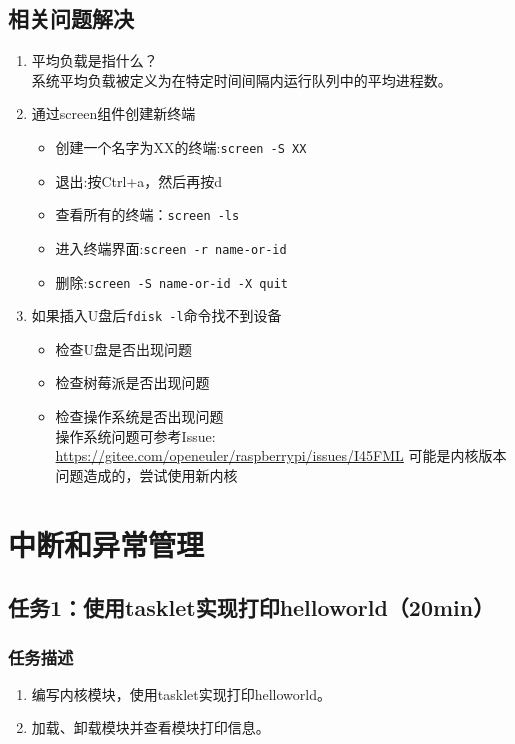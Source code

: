 \documentclass{article}
\begin{document}
\newpage

\subsection{相关问题解决}

\begin{enumerate}

	\item 平均负载是指什么？\\
	      系统平均负载被定义为在特定时间间隔内运行队列中的平均进程数。
	\item 通过screen组件创建新终端
	      \begin{itemize}
		      \item 创建一个名字为XX的终端:\verb|screen -S XX|
		      \item 退出:按Ctrl+a，然后再按d
		      \item 查看所有的终端：\verb|screen -ls|
		      \item 进入终端界面:\verb|screen -r name-or-id|
		      \item 删除:\verb|screen -S name-or-id -X quit|
	      \end{itemize}
	\item 如果插入U盘后\verb|fdisk -l|命令找不到设备
	      \begin{itemize}
		      \item 检查U盘是否出现问题
		      \item 检查树莓派是否出现问题
		      \item 检查操作系统是否出现问题\\
		            操作系统问题可参考Issue: \url{https://gitee.com/openeuler/raspberrypi/issues/I45FML}
		            可能是内核版本问题造成的，尝试使用新内核
	      \end{itemize}
\end{enumerate}
\newpage


\section{中断和异常管理}
\subsection{任务1：使用tasklet实现打印helloworld（20min）}

\subsubsection{任务描述}
\begin{enumerate}
	\item 编写内核模块，使用tasklet实现打印helloworld。
	\item 加载、卸载模块并查看模块打印信息。
\end{enumerate}
\end{document}
